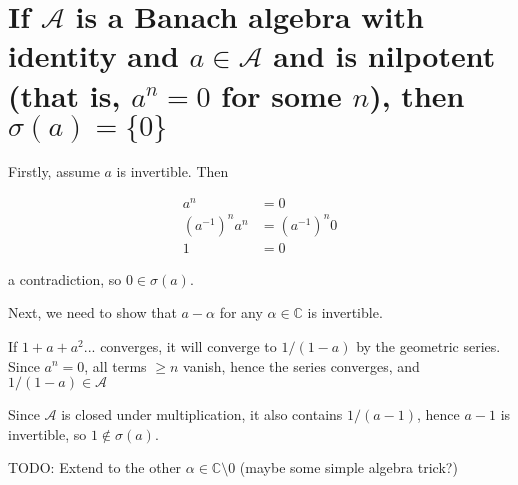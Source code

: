 \documentclass{article}
\begin{document}
\section{If $\mathscr{A}$ is a Banach algebra with identity and $a \in \mathscr{A}$ and is nilpotent (that is, $a^n=0$ for some $n$), then $\sigma(a) = \{0\}$}

Firstly, assume $a$ is invertible. Then 

\begin{align*}
    a^n &= 0 \\
    (a^{-1})^n a^n &= (a^{-1})^n 0 \\
    1 &= 0
\end{align*}

a contradiction, so $0 \in \sigma(a)$.

Next, we need to show that $a-\alpha$ for any $\alpha \in \mathbb{C}$ is invertible.

If $1 + a + a^2 ...$ converges, it will converge to $1 / (1-a)$ by the geometric series. Since $a^n=0$, all terms $\ge n$ vanish, hence the series converges, and $1/(1-a) \in \mathscr{A}$

Since $\mathscr{A}$ is closed under multiplication, it also contains $1/(a-1)$, hence $a-1$ is invertible, so $1 \not \in \sigma(a)$. 

TODO: Extend to the other $\alpha \in \mathbb{C} \setminus 0 $ (maybe some simple algebra trick?)
\end{document}
